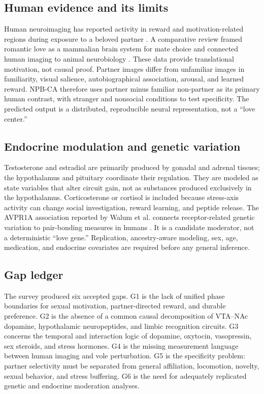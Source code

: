 \documentclass[conference]{IEEEtran}
\begin{document}
\subsection{Human evidence and its limits}
Human neuroimaging has reported activity in reward and motivation-related regions during exposure to a beloved partner \cite{bartels2000}. A comparative review framed romantic love as a mammalian brain system for mate choice and connected human imaging to animal neurobiology \cite{fisher2006}. These data provide translational motivation, not causal proof. Partner images differ from unfamiliar images in familiarity, visual salience, autobiographical association, arousal, and learned reward. NPB-CA therefore uses partner minus familiar non-partner as its primary human contrast, with stranger and nonsocial conditions to test specificity. The predicted output is a distributed, reproducible neural representation, not a ``love center.''

\subsection{Endocrine modulation and genetic variation}
Testosterone and estradiol are primarily produced by gonadal and adrenal tissues; the hypothalamus and pituitary coordinate their regulation. They are modeled as state variables that alter circuit gain, not as substances produced exclusively in the hypothalamus. Corticosterone or cortisol is included because stress-axis activity can change social investigation, reward learning, and peptide release. The AVPR1A association reported by Walum et al. connects receptor-related genetic variation to pair-bonding measures in humans \cite{walum2008}. It is a candidate moderator, not a deterministic ``love gene.'' Replication, ancestry-aware modeling, sex, age, medication, and endocrine covariates are required before any general inference.

\subsection{Gap ledger}
The survey produced six accepted gaps. G1 is the lack of unified phase boundaries for sexual motivation, partner-directed reward, and durable preference. G2 is the absence of a common causal decomposition of VTA--NAc dopamine, hypothalamic neuropeptides, and limbic recognition circuits. G3 concerns the temporal and interaction logic of dopamine, oxytocin, vasopressin, sex steroids, and stress hormones. G4 is the missing measurement language between human imaging and vole perturbation. G5 is the specificity problem: partner selectivity must be separated from general affiliation, locomotion, novelty, sexual behavior, and stress buffering. G6 is the need for adequately replicated genetic and endocrine moderation analyses.
\end{document}
